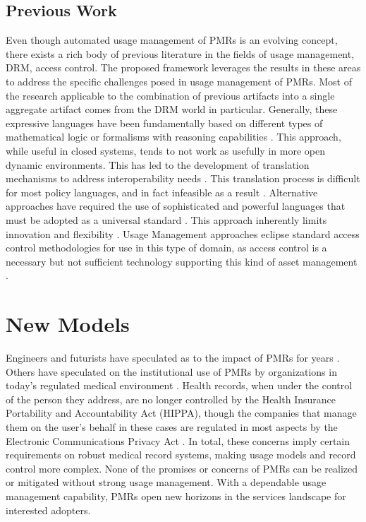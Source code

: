\documentclass[10pt, conference, compsocconf]{IEEEtran}
\begin{document}
\subsection{Previous Work}
Even though automated usage management of PMRs is an evolving concept, there exists a rich body of previous literature in the fields of usage management, DRM, access control. The proposed framework leverages the results in these areas to address the specific challenges posed in usage management of PMRs. Most of the research applicable to the combination of previous artifacts into a single aggregate artifact comes from the DRM world in particular.  Generally, these expressive languages have been fundamentally based on different types of mathematical logic or formalisms with reasoning capabilities \cite{ArHu:07,BaMi:06,ChCoEtHaJoLa:03,HaWe:04,XiBjFu:08}.  This approach, while useful in closed systems, tends to not work as usefully in more open dynamic environments.  This has led to the development of translation mechanisms to address interoperability needs \cite{HeJa:05,PoPrDe:04,ScTaWo:04}.  This translation process is difficult for most policy languages, and in fact infeasible as a result \cite{KoLaMaMi:04,SaShUe:04}.  Alternative approaches have required the use of sophisticated and powerful languages that must be adopted as a universal standard \cite{OMADRM,ODRL-req,Wa:04,XrML-spec}.  This approach inherently limits innovation and flexibility \cite{HeJa:05,JaHe:04,JaHe:08,JaHeMa:06}.  Usage Management approaches eclipse standard access control methodologies for use in this type of domain, as access control is a necessary but not sufficient technology supporting this kind of asset management \cite{PaSa:04,BL:73,BL:76}.

\section{New Models}
Engineers and futurists have speculated as to the impact of PMRs for years \cite{Emr:Web:BestCaseEMR,Emr:Web:WorstCaseEMR}.  Others have speculated on the institutional use of PMRs by organizations in today's regulated medical environment \cite{Emr:doi:10.1056/NEJMc081118}.  Health records, when under the control of the person they address, are no longer controlled by the Health Insurance Portability and Accountability Act (HIPPA), though the companies that manage them on the user's behalf in these cases are regulated in most aspects by the Electronic Communications Privacy Act \cite{Emr:doi:10.1056/NEJMsb0800220}.  In total, these concerns imply certain requirements on robust medical record systems, making usage models and record control more complex.  None of the promises or concerns of PMRs can be realized or mitigated without strong usage management.  With a dependable usage management capability, PMRs open new horizons in the services landscape for interested adopters.
\end{document}

